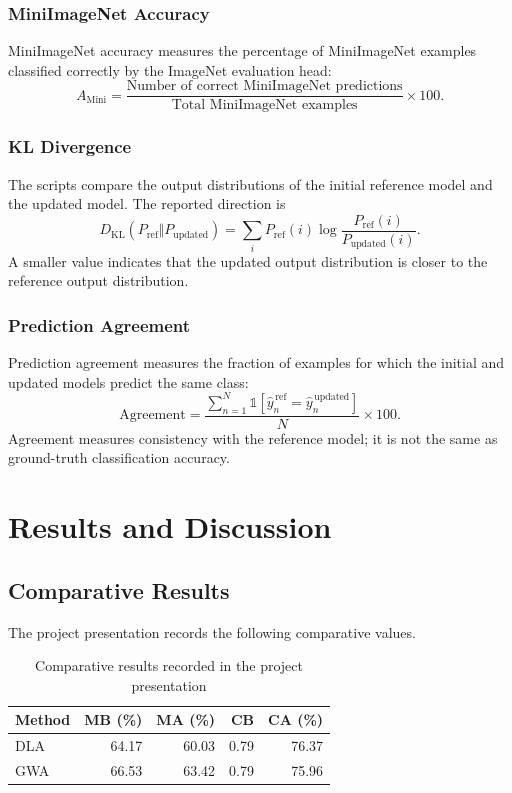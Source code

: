 \documentclass[12pt,a4paper]{report}
\begin{document}
\subsection{MiniImageNet Accuracy}
MiniImageNet accuracy measures the percentage of MiniImageNet examples
classified correctly by the ImageNet evaluation head:
\[
A_{\mathrm{Mini}}=
\frac{\text{Number of correct MiniImageNet predictions}}
{\text{Total MiniImageNet examples}}\times100.
\]

\subsection{KL Divergence}
The scripts compare the output distributions of the initial reference
model and the updated model. The reported direction is
\[
D_{\mathrm{KL}}(P_{\mathrm{ref}}\Vert P_{\mathrm{updated}})
=
\sum_i P_{\mathrm{ref}}(i)
\log\frac{P_{\mathrm{ref}}(i)}{P_{\mathrm{updated}}(i)}.
\]
A smaller value indicates that the updated output distribution is
closer to the reference output distribution.

\subsection{Prediction Agreement}
Prediction agreement measures the fraction of examples for which the
initial and updated models predict the same class:
\[
\mathrm{Agreement}=
\frac{\sum_{n=1}^{N}
\mathbb{1}[\hat y_n^{\,\mathrm{ref}}=
\hat y_n^{\,\mathrm{updated}}]}{N}\times100.
\]
Agreement measures consistency with the reference model; it is not
the same as ground-truth classification accuracy.

\chapter{Results and Discussion}

\section{Comparative Results}
The project presentation records the following comparative values.

\begin{table}[H]
\centering
\caption{Comparative results recorded in the project presentation}
\label{tab:results}
\begin{tabular}{lrrrr}
\toprule
\textbf{Method} & \textbf{MB (\%)} & \textbf{MA (\%)} &
\textbf{CB} & \textbf{CA (\%)}\\
\midrule
DLA & 64.17 & 60.03 & 0.79 & 76.37\\
GWA & 66.53 & 63.42 & 0.79 & 75.96\\
\bottomrule
\end{tabular}
\end{table}
\end{document}
